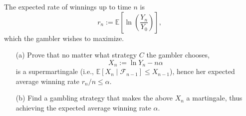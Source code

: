 \documentclass[11pt]{article}
\begin{document}
The expected rate of winnings up to time \(n\) is
\[
r_n := \mathbb{E} \left[\ln\left(\frac{Y_n}{Y_0}\right)\right],
\]
which the gambler wishes to maximize.

\begin{itemize}
    \item[(a)] Prove that no matter what strategy \(C\) the gambler chooses,
    \[
    X_n := \ln Y_n - n\alpha
    \]
    is a supermartingale (i.e., \(\mathbb{E}[X_n \mid \mathcal{F}_{n-1}] \leq X_{n-1}\)), hence her expected average winning rate \(r_n / n \leq \alpha\).
    \item[(b)] Find a gambling strategy that makes the above \(X_n\) a martingale, thus achieving the expected average winning rate \(\alpha\).
\end{itemize}
\end{document}

